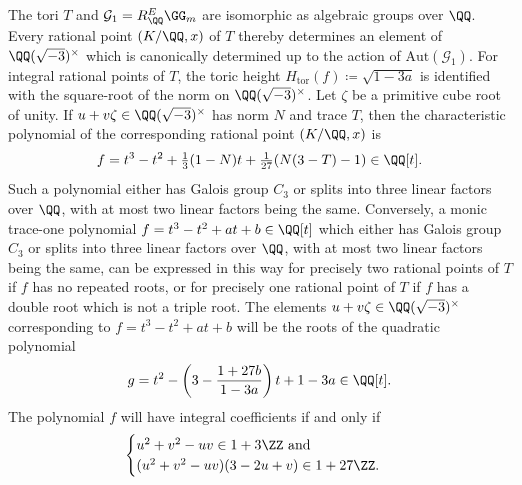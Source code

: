 \begin{proposition}\label{prop:cyclotomicParametrization} The tori $T$ and $\mathcal G_1 = R^E_\QQ \mathcal \GG_m$ are isomorphic as algebraic groups over $\QQ$. Every rational point $(K/\QQ,x)$ of $T$ thereby determines an element of $\QQ(\sqrt{-3})^\times$ which is canonically determined up to the action of $\mathrm{Aut}(\mathcal G_1)$. For integral rational points of $T$, the toric height $H_{\mathrm{tor}}(f)\coloneqq\sqrt{1-3a}$ is identified with the square-root of the norm on $\QQ(\sqrt{-3})^\times$. Let $\zeta$ be a primitive cube root of unity. If $u+v\zeta \in \QQ(\sqrt{-3})^\times$ has norm $N$ and trace $T$, then the characteristic polynomial of the corresponding rational point $(K/\QQ,x)$ is \begin{equation} f=t^3-t^2+\tfrac{1}{3}(1 - N)t+\tfrac{1}{27}(N(3-T)-1) \in \QQ[t]. \end{equation} Such a polynomial either has Galois group $C_3$ or splits into three linear factors over $\QQ$, with at most two linear factors being the same. Conversely, a monic trace-one polynomial $f=t^3-t^2+at+b \in \QQ[t]$ which either has Galois group $C_3$ or splits into three linear factors over $\QQ$, with at most two linear factors being the same, can be expressed in this way for precisely two rational points of $T$ if $f$ has no repeated roots, or for precisely one rational point of $T$ if $f$ has a double root which is not a triple root. The elements $u+v\zeta \in \QQ(\sqrt{-3})^\times$ corresponding to $f=t^3-t^2+at+b$ will be the roots of the quadratic polynomial \begin{equation} g = t^2 - \left(3-\frac{1+27b}{1-3a}\right)t + 1-3a \in \QQ[t]. \end{equation} The polynomial $f$ will have integral coefficients if and only if \begin{equation}\label{eqn:integralityConditionsUsingCyclo} \begin{cases} u^2+v^2-uv \in 1+3 \ZZ \text{ and }\\ (u^2+v^2-uv)(3-2u+v) \in 1+27 \ZZ. \end{cases} \end{equation} \end{proposition}

